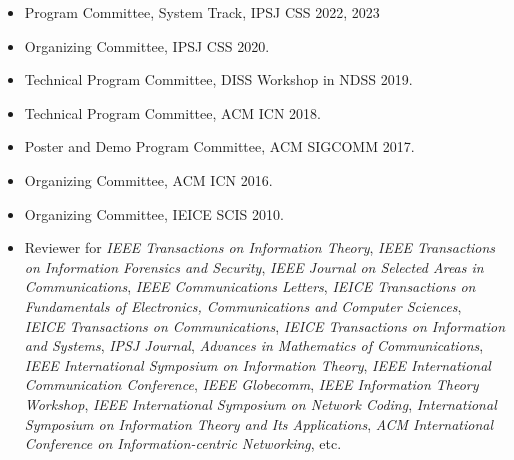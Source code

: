\begin{itemize}
 \item Program Committee, System Track, IPSJ CSS 2022, 2023
 \item Organizing Committee, IPSJ CSS 2020.
 \item Technical Program Committee, DISS Workshop in NDSS 2019.
 \item Technical Program Committee, ACM ICN 2018.
 \item Poster and Demo Program Committee, ACM SIGCOMM 2017.
 \item Organizing Committee, ACM ICN 2016.
 \item Organizing Committee, IEICE SCIS 2010.
 \item Reviewer for
\textit{IEEE Transactions on Information Theory},
\textit{IEEE Transactions on Information Forensics and Security},
\textit{IEEE Journal on Selected Areas in Communications},
\textit{IEEE Communications Letters},
\textit{IEICE Transactions on Fundamentals of Electronics, Communications and Computer Sciences},
\textit{IEICE Transactions on Communications},
\textit{IEICE Transactions on Information and Systems},
\textit{IPSJ Journal},
\textit{Advances in Mathematics of Communications},
\textit{IEEE International Symposium on Information Theory},
\textit{IEEE International Communication Conference},
\textit{IEEE Globecomm},
\textit{IEEE Information Theory Workshop},
\textit{IEEE International Symposium on Network Coding},
\textit{International Symposium on Information Theory and Its Applications},
\textit{ACM International Conference on Information-centric Networking},
%
etc.
\end{itemize}
